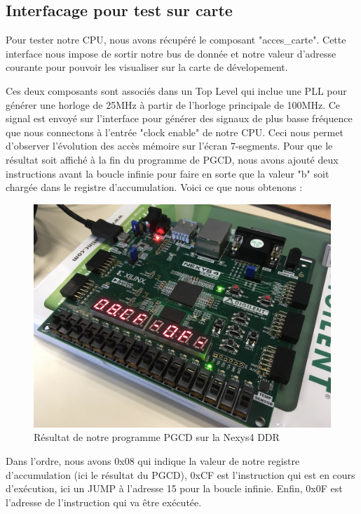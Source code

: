 \documentclass{article}
\begin{document}
    \subsection{Interfacage pour test sur carte}
    \par Pour tester notre CPU, nous avons récupéré le composant "acces\_carte". Cette interface nous impose de sortir notre bus de donnée et notre valeur d'adresse courante pour pouvoir les visualiser sur la carte de dévelopement.
    \par Ces deux composants sont associés dans un Top Level qui inclue une PLL pour générer une horloge de 25MHz à partir de l'horloge principale de 100MHz. Ce signal est envoyé sur l'interface pour générer des signaux de plus basse fréquence que nous connectons à l'entrée "clock enable" de notre CPU. Ceci nous permet d'observer l'évolution des accès mémoire sur l'écran 7-segments. Pour que le résultat soit affiché à la fin du programme de PGCD, nous avons ajouté deux instructions avant la boucle infinie pour faire en sorte que la valeur "b" soit chargée dans le registre d'accumulation. Voici ce que nous obtenons :
    \begin{figure}[h]
        \centering
        \includegraphics[width=\textwidth]{../doc/photo/resultat_test_pgcd.jpeg}
        \caption{Résultat de notre programme PGCD sur la Nexys4 DDR}
        \label{fig:resultat_test_pgcd}
    \end{figure}
    \par Dans l'ordre, nous avons 0x08 qui indique la valeur de notre registre d'accumulation (ici le résultat du PGCD), 0xCF est l'instruction qui est en cours d'exécution, ici un JUMP à l'adresse 15 pour la boucle infinie. Enfin, 0x0F est l'adresse de l'instruction qui va être exécutée.
    \newpage
\end{document}

